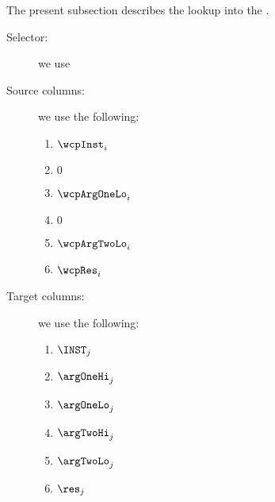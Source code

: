 The present subsection describes the lookup into the \wcpMod{}.
\begin{description}
	\item[Selector:] we use \iomf{}
	\item[Source columns:] we use the following:
		\begin{multicols}{3}
			\begin{enumerate}
				\item $\wcpInst       _{i}$
				\item $0$
				\item $\wcpArgOneLo   _{i}$
				\item $0$
				\item $\wcpArgTwoLo   _{i}$
				\item $\wcpRes        _{i}$
			\end{enumerate}
		\end{multicols}
	\item[Target columns:] we use the following:
		\begin{multicols}{3}
			\begin{enumerate}
				\item $\INST       _{j}$
				\item $\argOneHi   _{j}$
				\item $\argOneLo   _{j}$
				\item $\argTwoHi   _{j}$
				\item $\argTwoLo   _{j}$
				\item $\res        _{j}$
			\end{enumerate}
		\end{multicols}
\end{description}


